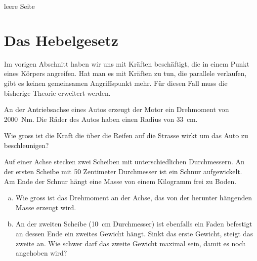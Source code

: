 \documentclass[12pt,a4paper,twoside]{article}
\def\dir{./Aufgaben_Mechanik/}
\newcommand{\Einbinden}[1]{}
\begin{document}
\newpage
leere Seite
\newpage
\section*{Das Hebelgesetz}
Im vorigen Abschnitt haben wir uns mit Kräften beschäftigt, die in einem Punkt eines Körpers angreifen.
Hat man es mit Kräften zu tun, die parallele verlaufen, gibt es keinen gemeinsamen Angriffspunkt mehr. 
Für diesen Fall muss die bisherige Theorie erweitert werden.

\Einbinden{\dir/drehmomente01.tex}
\Einbinden{\dir/drehmomente03.tex}%
\Einbinden{\dir/drehmomente05.tex}%
\Einbinden{\dir/drehmomente02.tex}%
\Einbinden{\dir/drehmomente04.tex}%

\begin{aufgabe}
	An der Antriebsachse eines Autos erzeugt der Motor ein Drehmoment von \SI{2000}{Nm}.
	Die Räder des Autos haben einen Radius von \SI{33}{cm}.

	Wie gross ist die Kraft die über die Reifen auf die Strasse wirkt um das Auto zu beschleunigen?

\end{aufgabe}

\begin{aufgabe}
	Auf einer Achse stecken zwei Scheiben mit unterschiedlichen Durchmessern.
	An der ersten Scheibe mit 50 Zentimeter Durchmesser ist ein Schnur aufgewickelt.
	Am Ende der Schnur hängt eine Masse von einem Kilogramm frei zu Boden.

	\begin{enumerate} [a)]
		\item Wie gross ist das Drehmoment an der Achse, das von der herunter hängenden Masse erzeugt wird.
		\item An der zweiten Scheibe (\SI{10}{cm} Durchmesser) ist ebenfalls ein Faden befestigt an dessen Ende ein zweites Gewicht hängt.
			Sinkt das erste Gewicht, steigt das zweite an. Wie schwer darf das zweite Gewicht maximal sein, damit es noch angehoben wird?
	\end{enumerate}

\end{aufgabe}
\end{document}
